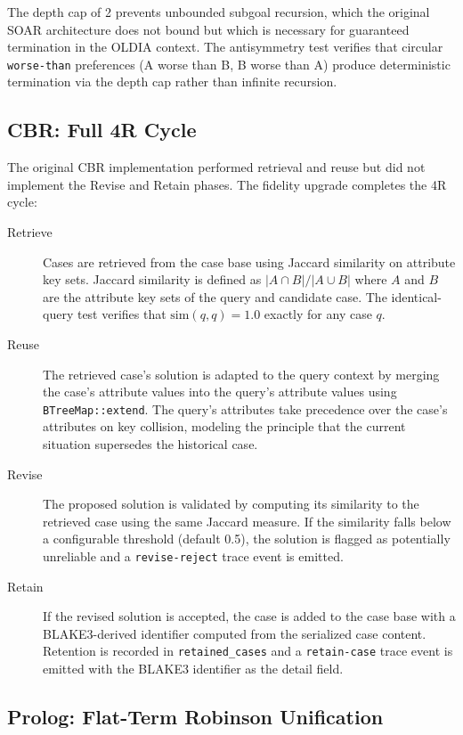 The depth cap of 2 prevents unbounded subgoal recursion, which the original SOAR architecture does not bound but which is necessary for guaranteed termination in the OLDIA context. The antisymmetry test verifies that circular \texttt{worse-than} preferences (A worse than B, B worse than A) produce deterministic termination via the depth cap rather than infinite recursion.

\subsection{CBR: Full 4R Cycle}

The original CBR implementation performed retrieval and reuse but did not implement the Revise and Retain phases. The fidelity upgrade completes the 4R cycle:

\begin{description}
\item[Retrieve] Cases are retrieved from the case base using Jaccard similarity on attribute key sets. Jaccard similarity is defined as $|A \cap B| / |A \cup B|$ where $A$ and $B$ are the attribute key sets of the query and candidate case. The identical-query test verifies that $\text{sim}(q, q) = 1.0$ exactly for any case $q$.

\item[Reuse] The retrieved case's solution is adapted to the query context by merging the case's attribute values into the query's attribute values using \texttt{BTreeMap::extend}. The query's attributes take precedence over the case's attributes on key collision, modeling the principle that the current situation supersedes the historical case.

\item[Revise] The proposed solution is validated by computing its similarity to the retrieved case using the same Jaccard measure. If the similarity falls below a configurable threshold (default 0.5), the solution is flagged as potentially unreliable and a \texttt{revise-reject} trace event is emitted.

\item[Retain] If the revised solution is accepted, the case is added to the case base with a BLAKE3-derived identifier computed from the serialized case content. Retention is recorded in \texttt{retained\_cases} and a \texttt{retain-case} trace event is emitted with the BLAKE3 identifier as the detail field.
\end{description}

\subsection{Prolog: Flat-Term Robinson Unification}

